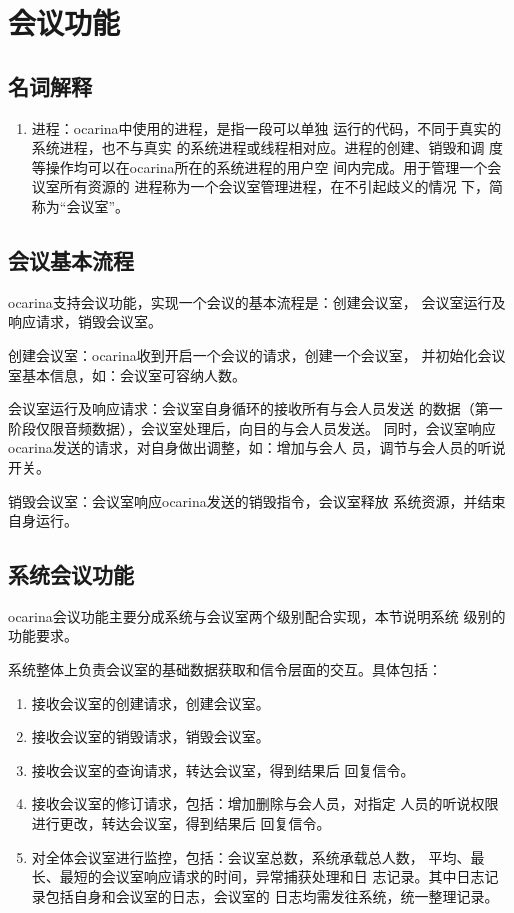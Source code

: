 \documentclass[11pt]{article}
\begin{document}
\section{会议功能}
\subsection{名词解释}
    \begin{enumerate}
        \item 进程：ocarina中使用的进程，是指一段可以单独
            运行的代码，不同于真实的系统进程，也不与真实
            的系统进程或线程相对应。进程的创建、销毁和调
            度等操作均可以在ocarina所在的系统进程的用户空
            间内完成。用于管理一个会议室所有资源的
            进程称为一个会议室管理进程，在不引起歧义的情况
            下，简称为“会议室”。
    \end{enumerate}
\subsection{会议基本流程}
    ocarina支持会议功能，实现一个会议的基本流程是：创建会议室，
会议室运行及响应请求，销毁会议室。

    创建会议室：ocarina收到开启一个会议的请求，创建一个会议室，
并初始化会议室基本信息，如：会议室可容纳人数。

    会议室运行及响应请求：会议室自身循环的接收所有与会人员发送
的数据（第一阶段仅限音频数据），会议室处理后，向目的与会人员发送。
同时，会议室响应ocarina发送的请求，对自身做出调整，如：增加与会人
员，调节与会人员的听说开关。

    销毁会议室：会议室响应ocarina发送的销毁指令，会议室释放
系统资源，并结束自身运行。

\subsection{系统会议功能}
    ocarina会议功能主要分成系统与会议室两个级别配合实现，本节说明系统
级别的功能要求。
    
    系统整体上负责会议室的基础数据获取和信令层面的交互。具体包括：

    \begin{enumerate}
        \item 接收会议室的创建请求，创建会议室。
        \item 接收会议室的销毁请求，销毁会议室。
        \item 接收会议室的查询请求，转达会议室，得到结果后
            回复信令。
        \item 接收会议室的修订请求，包括：增加删除与会人员，对指定
            人员的听说权限进行更改，转达会议室，得到结果后
            回复信令。
        \item 对全体会议室进行监控，包括：会议室总数，系统承载总人数，
            平均、最长、最短的会议室响应请求的时间，异常捕获处理和日
            志记录。其中日志记录包括自身和会议室的日志，会议室的
            日志均需发往系统，统一整理记录。
    \end{enumerate}
    
\end{document}
